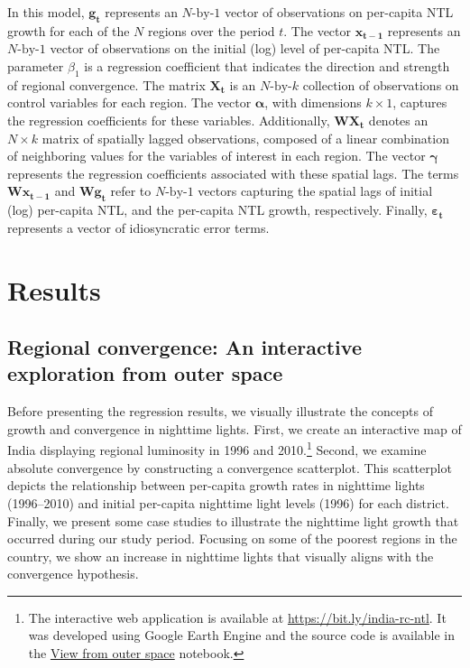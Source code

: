 \documentclass[
  a4paper, 
  twoside,
  review
]{article}
\newcounter{code}
\begin{document}
In this model, \(\boldsymbol{g_t}\) represents an \(N\text{-by-}1\)
vector of observations on per-capita NTL growth for each of the \(N\)
regions over the period \(t\). The vector \(\boldsymbol{x_{t-1}}\)
represents an \(N\text{-by-}1\) vector of observations on the initial
(log) level of per-capita NTL. The parameter \(\beta_1\) is a regression
coefficient that indicates the direction and strength of regional
convergence. The matrix \(\boldsymbol{X_t}\) is an \(N\text{-by-}k\)
collection of observations on control variables for each region. The
vector \(\boldsymbol{\alpha}\), with dimensions \(k \times 1\), captures
the regression coefficients for these variables. Additionally,
\(\boldsymbol{W}\boldsymbol{X_t}\) denotes an \(N \times k\) matrix of
spatially lagged observations, composed of a linear combination of
neighboring values for the variables of interest in each region. The
vector \(\boldsymbol{\gamma}\) represents the regression coefficients
associated with these spatial lags. The terms
\(\boldsymbol{W} \boldsymbol{x_{t-1}}\) and
\(\boldsymbol{W} \boldsymbol{g_t}\) refer to \(N\text{-by-}1\) vectors
capturing the spatial lags of initial (log) per-capita NTL, and the
per-capita NTL growth, respectively. Finally,
\(\boldsymbol{\varepsilon_t}\) represents a vector of idiosyncratic
error terms.

\section{Results}\label{results}

\subsection{Regional convergence: An interactive exploration from outer
space}\label{regional-convergence-an-interactive-exploration-from-outer-space}

Before presenting the regression results, we visually illustrate the
concepts of growth and convergence in nighttime lights. First, we create
an interactive map of India displaying regional luminosity in 1996 and
2010.\footnote{The interactive web application is available at
  \url{https://bit.ly/india-rc-ntl}. It was developed using Google Earth
  Engine and the source code is available in the
  \href{notebooks/c01_view_from_space.ipynb}{View from outer space}
  notebook.} Second, we examine absolute convergence by constructing a
convergence scatterplot. This scatterplot depicts the relationship
between per-capita growth rates in nighttime lights (1996--2010) and
initial per-capita nighttime light levels (1996) for each district.
Finally, we present some case studies to illustrate the nighttime light
growth that occurred during our study period. Focusing on some of the
poorest regions in the country, we show an increase in nighttime lights
that visually aligns with the convergence hypothesis.
\end{document}
